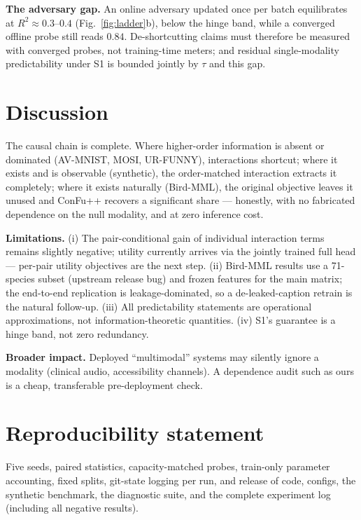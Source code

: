 \documentclass[10pt,twocolumn,letterpaper]{article}
\begin{document}
\textbf{The adversary gap.} An online adversary updated once per batch equilibrates at
$R^2{\approx}0.3$--$0.4$ (Fig.~\ref{fig:ladder}b), below the hinge band, while a converged
offline probe still reads $0.84$. De-shortcutting claims must therefore be measured with
converged probes, not training-time meters; and residual single-modality predictability under S1
is bounded jointly by $\tau$ and this gap.

\section{Discussion}
The causal chain is complete. Where higher-order information is absent or dominated (AV-MNIST,
MOSI, UR-FUNNY), interactions shortcut; where it exists and is observable (synthetic), the
order-matched interaction extracts it completely; where it exists naturally (Bird-MML), the
original objective leaves it unused and ConFu++ recovers a significant share --- honestly, with
no fabricated dependence on the null modality, and at zero inference cost.

\textbf{Limitations.} (i) The pair-conditional gain of individual interaction terms remains
slightly negative; utility currently arrives via the jointly trained full head --- per-pair
utility objectives are the next step. (ii) Bird-MML results use a 71-species subset (upstream
release bug) and frozen features for the main matrix; the end-to-end replication is
leakage-dominated, so a de-leaked-caption retrain is the natural follow-up. (iii) All
predictability statements are operational approximations, not information-theoretic quantities.
(iv) S1's guarantee is a hinge band, not zero redundancy.

\textbf{Broader impact.} Deployed ``multimodal'' systems may silently ignore a modality
(clinical audio, accessibility channels). A dependence audit such as ours is a cheap,
transferable pre-deployment check.

\section*{Reproducibility statement}
Five seeds, paired statistics, capacity-matched probes, train-only parameter accounting, fixed
splits, git-state logging per run, and release of code, configs, the synthetic benchmark, the
diagnostic suite, and the complete experiment log (including all negative results).
\end{document}

